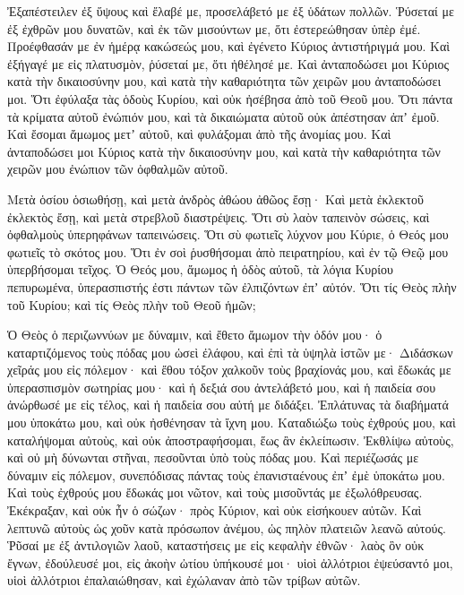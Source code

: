 \begin{spacing}{1.1}
\begin{multicols}{2}
Ἐξαπέστειλεν ἐξ ὕψους καὶ ἔλαβέ με, προσελάβετό με ἐξ ὑδάτων πολλῶν.
Ῥύσεταί με ἐξ ἐχθρῶν μου δυνατῶν, καὶ ἐκ τῶν μισούντων με, ὅτι ἐστερεώθησαν ὑπὲρ ἐμέ.
Προέφθασάν με ἐν ἡμέρᾳ κακώσεώς μου, καὶ ἐγένετο Κύριος ἀντιστήριγμά μου.
Καὶ ἐξήγαγέ με εἰς πλατυσμὸν, ῥύσεταί με, ὅτι ἠθέλησέ με.
Καὶ ἀνταποδώσει μοι Κύριος κατὰ τὴν δικαιοσύνην μου, καὶ κατὰ τὴν καθαριότητα τῶν χειρῶν μου ἀνταποδώσει μοι.
Ὅτι ἐφύλαξα τὰς ὁδοὺς Κυρίου, καὶ οὐκ ἠσέβησα ἀπὸ τοῦ Θεοῦ μου.
Ὅτι πάντα τὰ κρίματα αὐτοῦ ἐνώπιόν μου, καὶ τὰ δικαιώματα αὐτοῦ οὐκ ἀπέστησαν ἀπʼ ἐμοῦ.
Καὶ ἔσομαι ἄμωμος μετʼ αὐτοῦ, καὶ φυλάξομαι ἀπὸ τῆς ἀνομίας μου.
Καὶ ἀνταποδώσει μοι Κύριος κατὰ τὴν δικαιοσύνην μου, καὶ κατὰ τὴν καθαριότητα τῶν χειρῶν μου ἐνώπιον τῶν ὀφθαλμῶν αὐτοῦ.

Μετὰ ὁσίου ὁσιωθήσῃ, καὶ μετὰ ἀνδρὸς ἀθώου ἀθῶος ἔσῃ·
Καὶ μετὰ ἐκλεκτοῦ ἐκλεκτὸς ἔσῃ, καὶ μετὰ στρεβλοῦ διαστρέψεις.
Ὅτι σὺ λαὸν ταπεινὸν σώσεις, καὶ ὀφθαλμοὺς ὑπερηφάνων ταπεινώσεις.
Ὅτι σὺ φωτιεῖς λύχνον μου Κύριε, ὁ Θεός μου φωτιεῖς τὸ σκότος μου.
Ὅτι ἐν σοὶ ῥυσθήσομαι ἀπὸ πειρατηρίου, καὶ ἐν τῷ Θεῷ μου ὑπερβήσομαι τεῖχος.
Ὁ Θεός μου, ἄμωμος ἡ ὁδὸς αὐτοῦ, τὰ λόγια Κυρίου πεπυρωμένα, ὑπερασπιστής ἐστι πάντων τῶν ἐλπιζόντων ἐπʼ αὐτόν.
Ὅτι τίς Θεὸς πλὴν τοῦ Κυρίου; καὶ τίς Θεὸς πλὴν τοῦ Θεοῦ ἡμῶν;

Ὁ Θεὸς ὁ περιζωννύων με δύναμιν, καὶ ἔθετο ἄμωμον τὴν ὁδόν μου·
ὁ καταρτιζόμενος τοὺς πόδας μου ὡσεὶ ἐλάφου, καὶ ἐπὶ τὰ ὑψηλὰ ἱστῶν με·
Διδάσκων χεῖράς μου εἰς πόλεμον· καὶ ἔθου τόξον χαλκοῦν τοὺς βραχίονάς μου,
καὶ ἔδωκάς με ὑπερασπισμὸν σωτηρίας μου· καὶ ἡ δεξιά σου ἀντελάβετό μου, καὶ ἡ παιδεία σου ἀνώρθωσέ με εἰς τέλος, καὶ ἡ παιδεία σου αὐτή με διδάξει.
Ἐπλάτυνας τὰ διαβήματά μου ὑποκάτω μου, καὶ οὐκ ἠσθένησαν τὰ ἴχνη μου.
Καταδιώξω τοὺς ἐχθρούς μου, καὶ καταλήψομαι αὐτοὺς, καὶ οὐκ ἀποστραφήσομαι, ἕως ἂν ἐκλείπωσιν.
Ἐκθλίψω αὐτοὺς, καὶ οὐ μὴ δύνωνται στῆναι, πεσοῦνται ὑπὸ τοὺς πόδας μου.
Καὶ περιέζωσάς με δύναμιν εἰς πόλεμον, συνεπόδισας πάντας τοὺς ἐπανισταένους ἐπʼ ἐμὲ ὑποκάτω μου.
Καὶ τοὺς ἐχθρούς μου ἔδωκάς μοι νῶτον, καὶ τοὺς μισοῦντάς με ἐξωλόθρευσας.
Ἐκέκραξαν, καὶ οὐκ ἦν ὁ σώζων· πρὸς Κύριον, καὶ οὐκ εἰσήκουεν αὐτῶν.
Καὶ λεπτυνῶ αὐτοὺς ὡς χοῦν κατὰ πρόσωπον ἀνέμου, ὡς πηλὸν πλατειῶν λεανῶ αὐτούς.
Ῥῦσαί με ἐξ ἀντιλογιῶν λαοῦ, καταστήσεις με εἰς κεφαλὴν ἐθνῶν· λαὸς ὃν οὐκ ἔγνων, ἐδούλευσέ μοι,
εἰς ἀκοὴν ὠτίου ὑπήκουσέ μοι· υἱοὶ ἀλλότριοι ἐψεύσαντό μοι,
υἱοὶ ἀλλότριοι ἐπαλαιώθησαν, καὶ ἐχώλαναν ἀπὸ τῶν τρίβων αὐτῶν.


\end{multicols}
\end{spacing}
